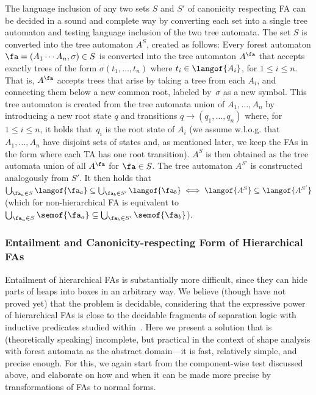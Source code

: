 The language inclusion of any two sets $S$ and $S'$ of canonicity respecting FA can be decided in a sound and complete way by converting each set into a single tree automaton and testing language inclusion of the two tree automata.
%
The set $S$ is converted into the tree automaton $A^S$, created as follows:
Every forest automaton $\fa = (A_1\cdots A_n,\sigma)\in S$ is converted into the tree automaton $A^\fa$ that accepts exactly trees of the form 
$\sigma(t_1,\ldots,t_n)$ where $t_i\in\langof{A_i}$, for $1\leq i\leq n$. 
That is, $A^\fa$ accepts trees that arise by taking a tree from each $A_i$, and connecting them below a new common root, labeled by~$\sigma$ as a new symbol.
This tree automaton is created from the tree automata union of $A_1,\ldots,A_n$
by introducing a new root state $q$ and transitions
$q\rightarrow(q_1,\ldots,q_n)$ where, for $1\leq i \leq n$, it holds that~$q_i$ is the root state of
$A_i$ (we assume w.l.o.g. that $A_1, \ldots, A_n$ have disjoint sets of
states and, as mentioned later, we keep the FAs in the form where each TA has one root transition).
%
$A^S$ is then obtained as the tree automata union of all $A^\fa$ for $\fa\in S$. 
%
The tree automaton $A^{S'}$ is constructed analogously from $S'$.
It then holds that 
$\bigcup_{\fa_a\in S}\langof{\fa_a} \subseteq \bigcup_{\fa_{b}\in S'}\langof{\fa_{b}} \iff \langof{A^S}\subseteq\langof{A^{S'}}$ (which for non-hierarchical FA is equivalent to $\bigcup_{\fa_a\in S}\semof{\fa_a} \subseteq \bigcup_{\fa_{b}\in S'}\semof{\fa_{b}}$).



\subsubsection*{Entailment and Canonicity-respecting Form of Hierarchical FAs}\label{sec:label}
Entailment of hierarchical FAs is substantially more difficult, since they can
hide parts of heaps into boxes in an arbitrary way.
%
We believe (though have not proved yet) that
the problem is decidable, considering that the expressive power of
hierarchical FAs is close to the decidable fragments of separation logic with
inductive predicates studied within~\cite{iosif_treewidth_2013,Katelaan:seplog}.
%
%
Here we present a solution that is (theoretically speaking) incomplete, but
practical in the context of shape analysis with forest automata as the
abstract domain---it is fast, relatively simple, and
precise enough.
%
For this, we again start from the component-wise test discussed above, and
elaborate on how and when it can be made more precise by transformations of FAs
to normal forms.
%


